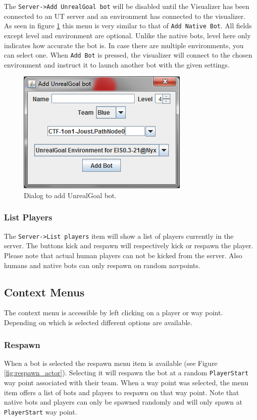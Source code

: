 \documentclass[11pt,a4paper]{article}
\begin{document}
The \texttt{Server->Add UnrealGoal bot} will be disabled until the Visualizer has been connected to an UT server and an environment has connected to the visualizer. As seen in figure \ref{fig:add_unrealgoal_bot} this menu is very similar to that of \texttt{Add Native Bot}. All fields except level and environment are optional. Unlike the native bots, level here only indicates how accurate the bot is. In case there are multiple environments, you can select one. When \texttt{Add Bot} is pressed, the visualizer will connect to the chosen environment and instruct it to launch another bot with the given settings.

\begin{figure}[h!]
\centering
\includegraphics{images/add_unrealgoal_bot.png}
\caption{Dialog to add UnrealGoal bot.}\label{fig:add_unrealgoal_bot}
\end{figure}

\subsubsection*{List Players}


The \texttt{Server->List players} item will show a list of players currently in the server. The buttons kick and respawn will respectively kick or respawn the player. Please note that actual human players can not be kicked from the server. Also humans and native bots can only respawn on random navpoints.


\subsection{Context Menus}
 The context menu is accessible by left clicking on a player or way point. Depending on which is selected different options are available.

%
\subsubsection*{Respawn}
%
When a bot is selected the respawn menu item is available (see Figure \ref{fig:respawn_actor}). Selecting it will respawn the bot at a random \texttt{PlayerStart} way point associated with their team. When a way point was selected, the menu item offers a list of bots and players to respawn on that way point. Note that native bots and players can only be spawned randomly and will only spawn at \texttt{PlayerStart} way point.
\end{document}

